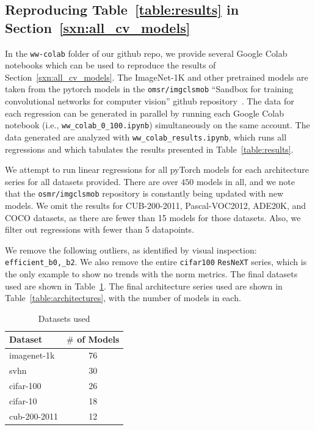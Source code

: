 \subsection{Reproducing Table~\ref{table:results} in Section~\ref{sxn:all_cv_models} }

In the \texttt{ww-colab} folder of our github repo, we provide several Google Colab notebooks which can be used to reproduce the results of Section~\ref{sxn:all_cv_models}.
The ImageNet-1K and other pretrained models are taken from the pytorch models in the \texttt{omsr/imgclsmob} 
``Sandbox for training convolutional networks for computer vision'' github repository~\cite{osmr}.
The data for each regression can be generated in parallel by running each Google Colab notebook (i.e., \texttt{ww\_colab\_0\_100.ipynb}) simultaneously on the same account.
The data generated are analyzed with \texttt{ww\_colab\_results.ipynb}, which runs all regressions and which tabulates the results presented in Table~\ref{table:results}.

We attempt to run linear regressions for all pyTorch models for each architecture series for all datasets provided.  
There are over $450$ models in all, and we note that the \texttt{osmr/imgclsmob} repository is constantly being updated with new models.
We omit the results for CUB-200-2011, Pascal-VOC2012, ADE20K, and COCO datasets, as there are fewer than 15 models for those datasets.  
Also, we filter out regressions with fewer than 5 datapoints.

We remove the following outliers, as identified by visual inspection: \texttt{efficient\_b0,\_b2}.
We also remove the entire \texttt{cifar100} \texttt{ResNeXT} series, which is the only example to show no trends with the norm metrics.
%
The final datasets used are shown in Table~\ref{table:datasets}.
The final architecture series used are shown in  Table~\ref{table:architectures}, with the number of models in each.

\begin{table}[t]
\small
\begin{center}
\begin{tabular}{|p{1in}|c|}
\hline
Dataset & $\#$ of Models \\
\hline
imagenet-1k   &  76 \\
svhn          &  30 \\
cifar-100     &  26 \\
cifar-10      &  18 \\
cub-200-2011  &  12 \\
\hline
\end{tabular}
\end{center}
\caption{Datasets used}
\label{table:datasets}
\end{table}

